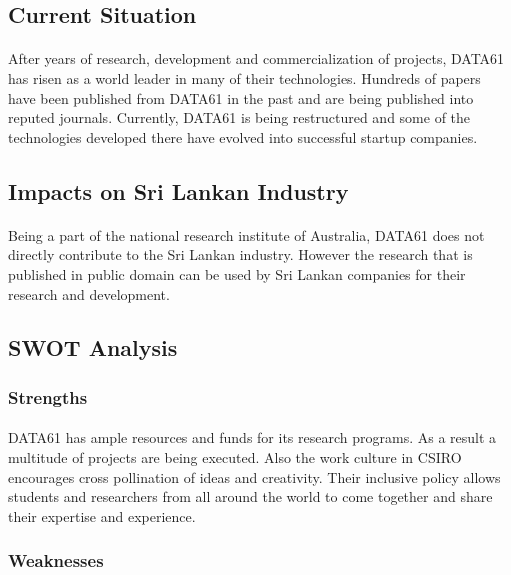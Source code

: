 \subsection{Current Situation}
\paragraph{}
After years of research, development and commercialization of projects, DATA61 has risen as a world leader in many of their technologies. Hundreds of papers have been published from DATA61 in the past and are being published into reputed journals. Currently, DATA61 is being restructured and some of the technologies developed there have evolved into successful startup companies.

\subsection{Impacts on Sri Lankan Industry}
\paragraph{}
Being a part of the national research institute of Australia, DATA61 does not directly contribute to the Sri Lankan industry. However the research that is published in public domain can be used by Sri Lankan companies for their research and development.

\newpage
\subsection{SWOT Analysis}

\subsubsection*{Strengths}
\paragraph{}
DATA61 has ample resources and funds for its research programs. As a result a multitude of projects are being executed. Also the work culture in CSIRO encourages cross pollination of ideas and creativity. Their inclusive policy allows students and researchers from all around the world to come together and share their expertise and experience.

\subsubsection*{Weaknesses}
